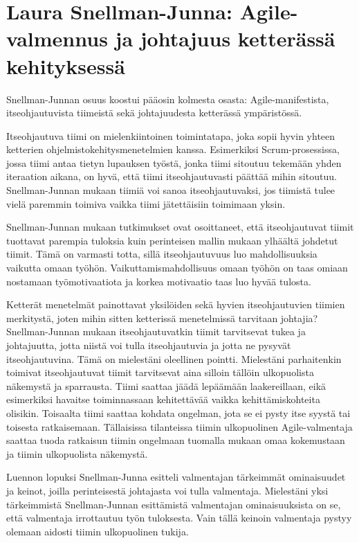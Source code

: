 \documentclass[a4paper]{article}
\begin{document}
\section{Laura Snellman-Junna: Agile-valmennus ja johtajuus ketterässä kehityksessä}

Snellman-Junnan osuus koostui pääosin kolmesta osasta: Agile-manifestista, itseohjautuvista tiimeistä sekä johtajuudesta ketterässä ympäristössä.

Itseohjautuva tiimi on mielenkiintoinen toimintatapa, joka sopii hyvin yhteen ketterien ohjelmistokehitysmenetelmien 
kanssa. Esimerkiksi Scrum-prosessissa, jossa tiimi antaa tietyn lupauksen työstä, jonka tiimi sitoutuu tekemään yhden iteraation aikana, on hyvä, että tiimi itseohjautuvasti päättää mihin sitoutuu. Snellman-Junnan mukaan tiimiä voi sanoa itseohjautuvaksi, jos tiimistä tulee vielä paremmin toimiva vaikka tiimi jätettäisiin toimimaan yksin.

Snellman-Junnan mukaan tutkimukset ovat osoittaneet, että itseohjautuvat tiimit tuottavat parempia tuloksia kuin perinteisen mallin mukaan ylhäältä johdetut tiimit. Tämä on varmasti totta, sillä itseohjautuvuus luo mahdollisuuksia vaikutta omaan työhön. Vaikuttamismahdollisuus omaan työhön on taas omiaan nostamaan työmotivaatiota ja korkea motivaatio taas luo hyvää tulosta.

Ketterät menetelmät painottavat yksilöiden sekä hyvien itseohjautuvien tiimien merkitystä, joten mihin sitten ketterissä menetelmissä tarvitaan johtajia? Snellman-Junnan mukaan itseohjautuvatkin tiimit tarvitsevat tukea ja johtajuutta, jotta niistä voi tulla itseohjautuvia ja jotta ne pysyvät itseohjautuvina. Tämä on mielestäni oleellinen pointti. Mielestäni parhaitenkin toimivat itseohjautuvat tiimit tarvitsevat aina silloin tällöin ulkopuolista näkemystä ja sparrausta. Tiimi saattaa jäädä lepäämään laakereillaan, eikä esimerkiksi havaitse toiminnassaan kehitettävää vaikka kehittämiskohteita olisikin. Toisaalta tiimi saattaa kohdata ongelman, jota se ei pysty itse syystä tai toisesta ratkaisemaan. Tällaisissa tilanteissa tiimin ulkopuolinen Agile-valmentaja saattaa tuoda ratkaisun tiimin ongelmaan tuomalla mukaan omaa kokemustaan ja tiimin ulkopuolista näkemystä.

Luennon lopuksi Snellman-Junna esitteli valmentajan tärkeimmät ominaisuudet ja keinot, joilla perinteisestä johtajasta voi tulla valmentaja. Mielestäni yksi tärkeimmistä Snellman-Junnan esittämistä valmentajan ominaisuuksista on se, että valmentaja irrottautuu työn tuloksesta. Vain tällä keinoin valmentaja pystyy olemaan aidosti tiimin ulkopuolinen tukija.
\end{document}
